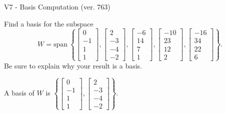 \begin{exercise}
  \begin{exerciseTitle}V7 - Basis Computation (ver. 763)\end{exerciseTitle}
  \begin{exerciseStatement}
    Find a basis for the subspace 
\[W=\mathrm{span}\ \left\{\left[\begin{array}{r}
0 \\
-1 \\
1 \\
1
\end{array}\right] , \left[\begin{array}{r}
2 \\
-3 \\
-4 \\
-2
\end{array}\right] , \left[\begin{array}{r}
-6 \\
14 \\
7 \\
1
\end{array}\right] , \left[\begin{array}{r}
-10 \\
23 \\
12 \\
2
\end{array}\right] , \left[\begin{array}{r}
-16 \\
34 \\
22 \\
6
\end{array}\right]\right\}.\]
 Be sure to explain why your result is a basis.


  \end{exerciseStatement}
  \begin{exerciseAnswer}
   A basis of \(W\) is  \(\left\{\left[\begin{array}{r}
0 \\
-1 \\
1 \\
1
\end{array}\right] , \left[\begin{array}{r}
2 \\
-3 \\
-4 \\
-2
\end{array}\right]\right\}\).
  


  \end{exerciseAnswer}
\end{exercise}